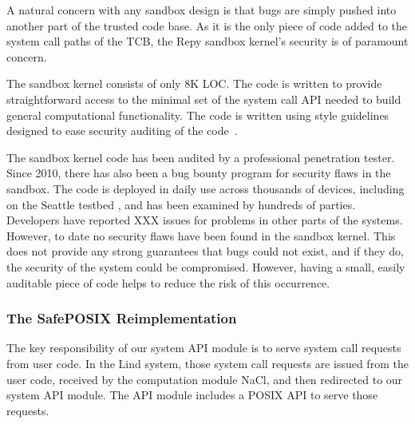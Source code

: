 
A natural concern with any sandbox design is that bugs are simply pushed into
another part of the trusted code base.  As it is the only piece of code added
to the system call paths of the TCB, the Repy sandbox kernel's security is of
paramount concern.

The sandbox kernel consists of only 8K LOC.
The code is written to provide straightforward access to the minimal set
of the system call API needed to build general computational functionality.
The code is written using style guidelines designed to ease security auditing
 of the code~\cite{style}.

The sandbox kernel code has been
audited by a professional penetration tester.  Since 2010, there has also been
a bug bounty program for security flaws in the sandbox.
The code is deployed in daily use across thousands of devices,
including on the Seattle testbed \cite{seattle}, and has been examined by
hundreds of parties.  Developers have reported
XXX issues for problems in other parts of the systems. However, to date
no security flaws have been found in the sandbox kernel.
This does not provide any strong guarantees that bugs could not exist, and if
they do, the security of the system could be compromised.
However, having a small, easily auditable piece of code helps to reduce the
risk of this occurrence.

\subsubsection{The SafePOSIX Reimplementation}

The key responsibility of our system API module is to serve system call requests from user code.
In the Lind system, those system call requests are issued from the user code,
received by the computation module NaCl, and then redirected to our system API module.
The API module includes a POSIX API to serve those requests.

